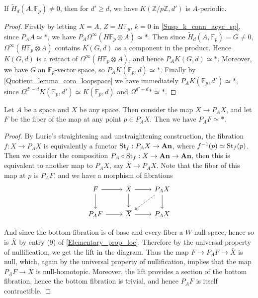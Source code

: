 	\begin{coro}\label{Homology_EM_periodic}
		If $\tilde{H}_d(A,\mathbb{F}_p)\neq0$, then for $d'\geq d$, we have $K(\mathbb{Z}/p\mathbb{Z},d')$ is $A$-periodic. 
	\end{coro}
	\begin{proof}
		Firstly by letting $X=A$, $Z=H\mathbb{F}_p$, $k=0$ in \cref{Susp_k_conn_acyc_sp}, since $P_AA\simeq*$, we have $P_A\Omega^\infty(H\mathbb{F}_p\otimes A)\simeq*$. Then since $\tilde{H}_d(A,\mathbb{F}_p)=G\neq0$, $\Omega^\infty(H\mathbb{F}_p\otimes A)$ contains $K(G,d)$ as a component in the product. Hence $K(G,d)$ is a retract of $\Omega^\infty(H\mathbb{F}_p\otimes A)$, and hence $P_AK(G,d)\simeq*$. Moreover, we have $G$ an $\mathbb{F}_p$-vector space, so $P_AK(\mathbb{F}_p,d)\simeq*$. Finally by \cref{Quotient_lemma_coro_loopspace} we have immediately $P_AK(\mathbb{F}_p,d')\simeq*$, since $\Omega^{d'-d}K(\mathbb{F}_p,d')\simeq K(\mathbb{F}_p,d)$ and $\Omega^{d'-d}*\simeq*$. 
	\end{proof}

	\begin{lemma}\label{Fib_nullification_periodic}
		Let $A$ be a space and $X$ be any space. Then consider the map $X\to P_AX$, and let $F$ be the fiber of the map at any point $p\in P_AX$. Then we have $P_AF\simeq*$. 
	\end{lemma}
	\begin{proof}
		By Lurie's straightening and unstraightening construction, the fibration $f:X\to P_AX$ is equivalently a functor $\operatorname{\mathrm{St}}_f:P_AX\to\mathbf{An}$, where $f^{-1}(p)\simeq\operatorname{\mathrm{St}}_f(p)$. Then we consider the composition $P_A\circ\operatorname{\mathrm{St}}_f:X\to\mathbf{An}\to\mathbf{An}$, then this is equivalent to another map to $P_AX$, say $\overline{X}\to P_AX$. Note that the fiber of this map at $p$ is $P_AF$, and we have a morphism of fibrations 
		\[\begin{tikzcd}[ampersand replacement=\&]
			F \& X \& {P_AX} \\
			{P_AF} \& {\overline{X}} \& {P_AX}
			\arrow[from=1-1, to=1-2]
			\arrow[from=1-1, to=2-1]
			\arrow[from=1-2, to=1-3]
			\arrow[from=1-2, to=2-2]
			\arrow[dashed, from=1-3, to=2-2]
			\arrow[from=1-3, to=2-3]
			\arrow[from=2-1, to=2-2]
			\arrow[from=2-2, to=2-3]
		\end{tikzcd}\]

		And since the bottom fibration is of base and every fiber a $W$-null space, hence so is $\overline{X}$ by entry (9) of \cref{Elementary_prop_loc}. Therefore by the universal property of nullification, we get the lift in the diagram. Thus the map $F\to P_AF\to\overline{X}$ is null, which, again by the universal property of nullification, implies that the map $P_AF\to\overline{X}$ is null-homotopic. Moreover, the lift provides a section of the bottom fibration, hence the bottom fibration is trivial, and hence $P_AF$ is itself contractible. 
	\end{proof}

